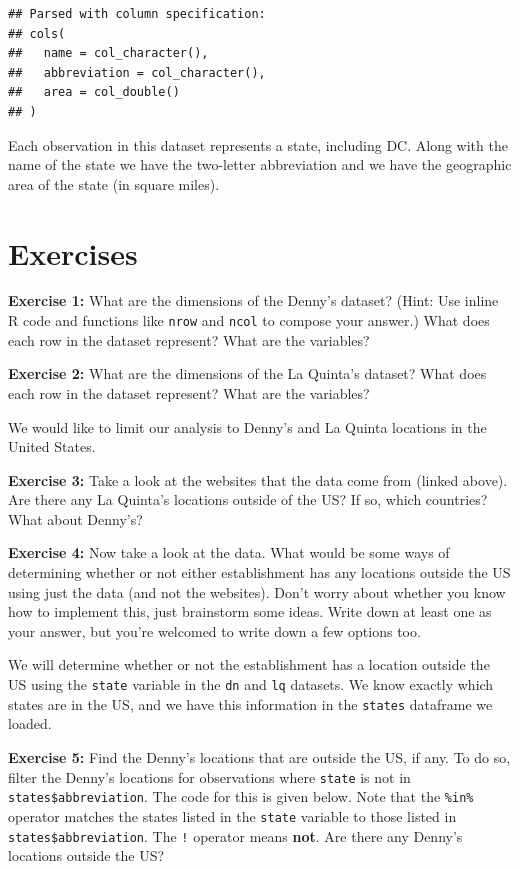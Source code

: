 \documentclass[]{book}
\theoremstyle{definition}
\theoremstyle{definition}
\theoremstyle{definition}
\theoremstyle{remark}
\begin{document}
\begin{verbatim}
## Parsed with column specification:
## cols(
##   name = col_character(),
##   abbreviation = col_character(),
##   area = col_double()
## )
\end{verbatim}

Each observation in this dataset represents a state, including DC. Along
with the name of the state we have the two-letter abbreviation and we
have the geographic area of the state (in square miles).

\chapter{Exercises}\label{exercises}

\textbf{Exercise 1:} What are the dimensions of the Denny's dataset?
(Hint: Use inline R code and functions like \texttt{nrow} and
\texttt{ncol} to compose your answer.) What does each row in the dataset
represent? What are the variables?

\textbf{Exercise 2:} What are the dimensions of the La Quinta's dataset?
What does each row in the dataset represent? What are the variables?

We would like to limit our analysis to Denny's and La Quinta locations
in the United States.

\textbf{Exercise 3:} Take a look at the websites that the data come from
(linked above). Are there any La Quinta's locations outside of the US?
If so, which countries? What about Denny's?

\textbf{Exercise 4:} Now take a look at the data. What would be some
ways of determining whether or not either establishment has any
locations outside the US using just the data (and not the websites).
Don't worry about whether you know how to implement this, just
brainstorm some ideas. Write down at least one as your answer, but
you're welcomed to write down a few options too.

We will determine whether or not the establishment has a location
outside the US using the \texttt{state} variable in the \texttt{dn} and
\texttt{lq} datasets. We know exactly which states are in the US, and we
have this information in the \texttt{states} dataframe we loaded.

\textbf{Exercise 5:} Find the Denny's locations that are outside the US,
if any. To do so, filter the Denny's locations for observations where
\texttt{state} is not in \texttt{states\$abbreviation}. The code for
this is given below. Note that the \texttt{\%in\%} operator matches the
states listed in the \texttt{state} variable to those listed in
\texttt{states\$abbreviation}. The \texttt{!} operator means
\textbf{not}. Are there any Denny's locations outside the US?
\end{document}
